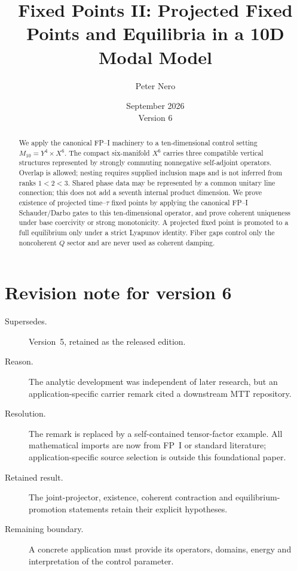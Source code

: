 \documentclass[11pt]{article}
\title{Fixed Points II: Projected Fixed Points and Equilibria in a 10D Modal Model}
\author{Peter Nero}
\date{September 2026\\Version 6}
\newcommand{\Mten}{\ensuremath{M_{10}}}
\newcommand{\Yfour}{\ensuremath{Y^{4}}}
\newcommand{\Xsix}{\ensuremath{X^{6}}}
\begin{document}
\maketitle
\seriestagline

\begin{abstract}
We apply the canonical FP--I machinery to a ten-dimensional control setting
$\Mten=\Yfour\times\Xsix$. The compact six-manifold $\Xsix$ carries three
compatible vertical structures represented by strongly commuting nonnegative
self-adjoint operators. Overlap is allowed; nesting requires supplied inclusion
maps and is not inferred from ranks $1<2<3$. Shared phase data may be represented
by a common unitary line connection; this does not add a seventh internal
product dimension. We prove existence of
projected time--$\tau$ fixed points by applying the canonical FP--I
Schauder/Darbo gates to this ten-dimensional operator, and prove coherent
uniqueness under base coercivity or
strong monotonicity. A projected fixed point is promoted to a full equilibrium
only under a strict Lyapunov identity. Fiber gaps control only the noncoherent
$Q$ sector and are never used as coherent damping.
\end{abstract}

\section*{Revision note for version 6}
\begin{description}
\item[Supersedes.] Version~5, retained as the released edition.
\item[Reason.] The analytic development was independent of later research,
but an application-specific carrier remark cited a downstream MTT repository.
\item[Resolution.] The remark is replaced by a self-contained tensor-factor
example. All mathematical imports are now from FP~I or standard literature;
application-specific source selection is outside this foundational paper.
\item[Retained result.] The joint-projector, existence, coherent contraction
and equilibrium-promotion statements retain their explicit hypotheses.
\item[Remaining boundary.] A concrete application must provide its operators,
domains, energy and interpretation of the control parameter.
\end{description}
\end{document}
